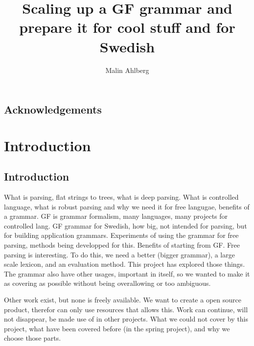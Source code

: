 \documentclass{report}
\begin{document}
\title{Scaling up a GF grammar and prepare it for cool stuff and for Swedish}
\author{Malin Ahlberg}
\maketitle
\newpage

\tableofcontents
\newpage

\abstract{
}

\newpage

\section*{Acknowledgements}

\newpage
\chapter{Introduction}
\section{Introduction} 
What is parsing, flat strings to trees, what is deep parsing. What is controlled language,
what is robust parsing and why we need it for free langugae, benefits of a grammar.
GF is grammar formalism, many languages, many projects for controlled lang.
GF grammar for Swedish, how big, not intended for parsing, but for building
application grammars. Experiments of using the grammar for free parsing, methods
being developped for this. Benefits of starting from GF. Free parsing is
interesting. To do this, we need a better (bigger grammar), a large scale
lexicon, and an evaluation method. This project has explored those things. The
grammar also have other usages, important in itself, so we wanted to make it as
covering as possible without being overallowing or too ambiguous.

Other work exist, but none is freely available. We want to create a open source
product, therefor can only use resources that allows this. Work can continue,
will not disappear, be made use of in other projects.
What we could not cover by this project, what have been covered before (in
the spring project), and why we choose those parts.
\end{document}
